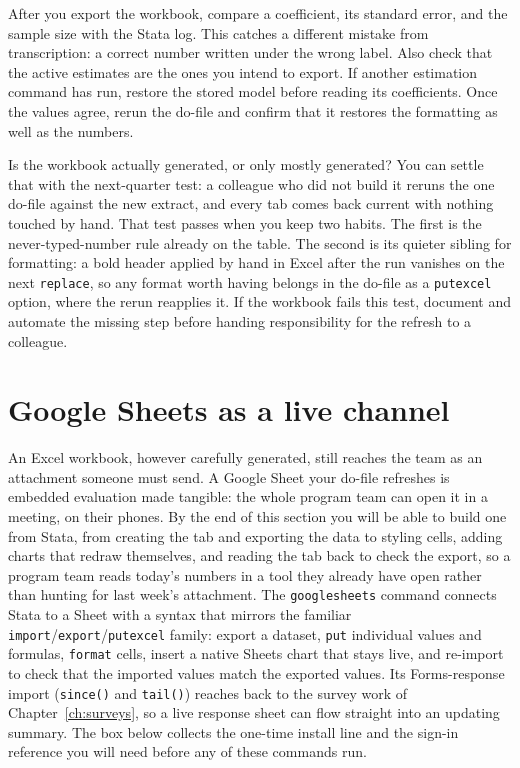 \documentclass[
    a4paper,
    fontsize=10pt,
    twoside=true,
    numbers=noenddot,
]{kaobook}
\begin{document}
After you export the workbook, compare a coefficient, its standard error, and the sample size with the Stata log. This catches a different mistake from transcription: a correct number written under the wrong label. Also check that the active estimates are the ones you intend to export. If another estimation command has run, restore the stored model before reading its coefficients. Once the values agree, rerun the do-file and confirm that it restores the formatting as well as the numbers.

Is the workbook actually generated, or only mostly generated? You can settle that with the next-quarter test: a colleague who did not build it reruns the one do-file against the new extract, and every tab comes back current with nothing touched by hand. That test passes when you keep two habits. The first is the never-typed-number rule already on the table. The second is its quieter sibling for formatting: a bold header applied by hand in Excel after the run vanishes on the next \texttt{replace}, so any format worth having belongs in the do-file as a \texttt{putexcel} option, where the rerun reapplies it. If the workbook fails this test, document and automate the missing step before handing responsibility for the refresh to a colleague.

\section{Google Sheets as a live channel}\label{sec:googlesheets}
An Excel workbook, however carefully generated, still reaches the team as an attachment someone must send. A Google Sheet your do-file refreshes is embedded evaluation made tangible: the whole program team can open it in a meeting, on their phones. By the end of this section you will be able to build one from Stata, from creating the tab and exporting the data to styling cells, adding charts that redraw themselves, and reading the tab back to check the export, so a program team reads today's numbers in a tool they already have open rather than hunting for last week's attachment. The \texttt{googlesheets} command connects Stata to a Sheet with a syntax that mirrors the familiar \texttt{import}/\texttt{export}/\texttt{putexcel} family: export a dataset, \texttt{put} individual values and formulas, \texttt{format} cells, insert a native Sheets chart that stays live, and re-import to check that the imported values match the exported values. Its Forms-response import (\texttt{since()} and \texttt{tail()}) reaches back to the survey work of Chapter~\ref{ch:surveys}, so a live response sheet can flow straight into an updating summary. The box below collects the one-time install line and the sign-in reference you will need before any of these commands run.
\end{document}
